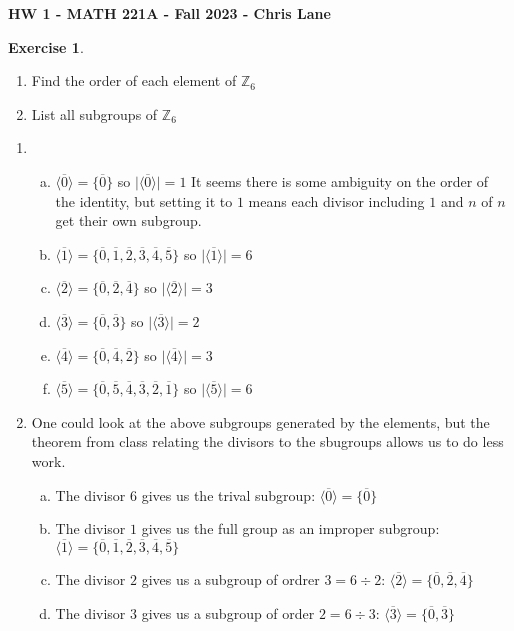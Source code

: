 \documentclass[11pt,oneside]{article}
\numberwithin{equation}{section}
\theoremstyle{definition}
\newtheorem{exercise}{Exercise}
\def\ZZ{\mathbb{Z}}
\begin{document}
\textbf{HW 1 - MATH 221A - Fall 2023 - Chris Lane}

\begin{exercise}
\begin{enumerate}[(1)]
\item 
Find the order of each element of $ \ZZ _ 6 $
\item 
  List all subgroups of $ \ZZ _ 6 $
\end{enumerate}
\end{exercise}

\begin{solution}
\begin{enumerate}[(1)]
\item 
\begin{enumerate}[(a)]
\item 
    $ \langle \overline 0 \rangle  = \{ \overline 0 \} $ so $ \lvert \langle \overline 0 \rangle \rvert = 1 $ It seems there is some ambiguity on the order of the identity, but setting it to $ 1 $ means each divisor including $1$ and $n$ of $n$ get their own subgroup.  
  \item
    $ \langle \overline 1 \rangle  = \{ \overline 0, \overline 1, \overline 2, \overline 3, \overline 4, \overline 5 \} $ so $ \lvert \langle \overline 1 \rangle \rvert = 6 $
  \item
    $ \langle \overline 2 \rangle  = \{ \overline 0, \overline  2, \overline  4 \} $ so $ \lvert \langle \overline 2 \rangle \rvert = 3 $
  \item
    $ \langle \overline 3 \rangle  = \{ \overline 0, \overline  3 \} $ so $ \lvert \langle \overline 3 \rangle \rvert = 2 $
  \item
    $ \langle \overline 4 \rangle  = \{ \overline 0, \overline  4, \overline  2 \} $ so $ \lvert \langle \overline 4 \rangle \rvert = 3 $
  \item
    $ \langle \overline 5 \rangle  = \{ \overline 0 , \overline 5 , \overline 4 , \overline 3 , \overline 2 , \overline 1 \} $ so $ \lvert \langle \overline 5 \rangle \rvert = 6 $
\end{enumerate}
\item 
  One could look at the above subgroups generated by the elements, but the theorem from class relating the divisors to the sbugroups allows us to do less work.  
\begin{enumerate}[(a)]
\item 
    The divisor $ 6 $ gives us the trival subgroup: $ \langle \overline 0 \rangle =  \{ \overline 0 \} $
\item
    The divisor $ 1 $ gives us the full group as an improper subgroup: $ \langle \overline 1 \rangle  = \{ \overline 0, \overline 1, \overline 2, \overline 3, \overline 4, \overline 5 \} $
  \item
    The divisor $ 2 $ gives us a subgroup of ordrer $ 3 = 6 \div 2 $: $\langle \overline 2 \rangle  = \{ \overline 0, \overline  2, \overline  4 \} $
  \item
    The divisor $3 $ gives us a subgroup of order $ 2 = 6 \div 3 $: $ \langle \overline 3 \rangle  = \{ \overline 0, \overline  3 \} $ 


\end{enumerate}
\end{enumerate}
\end{solution}
\end{document}
